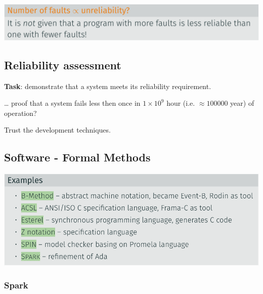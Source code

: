 \documentclass[
  10pt,
  a4paper,
  twocolumn]{article}
\begin{document}
\includegraphics{images/safety/image-16.png}

\subsection{Reliability assessment}\label{reliability-assessment}

\textbf{Task}: demonstrate that a system meets its reliability
requirement.

\begin{tcolorbox}[enhanced jigsaw, toprule=.15mm, opacityback=0, colbacktitle=quarto-callout-tip-color!10!white, breakable, colframe=quarto-callout-tip-color-frame, title=\textcolor{quarto-callout-tip-color}{\faLightbulb}\hspace{0.5em}{How to\ldots{}}, left=2mm, arc=.35mm, toptitle=1mm, bottomrule=.15mm, rightrule=.15mm, titlerule=0mm, bottomtitle=1mm, leftrule=.75mm, opacitybacktitle=0.6, coltitle=black, colback=white]

\ldots{} proof that a system fails less then once in \(1\times 10^{9}\)
hour (i.e. \(\approx 100 000\) year) of operation?

{\textcolor{OliveGreen}{Trust the development techniques}}.

\end{tcolorbox}

\subsection{Software - Formal Methods}\label{software---formal-methods}

\includegraphics{images/safety/image-17.png}

\subsubsection{Spark}\label{spark}
\end{document}
